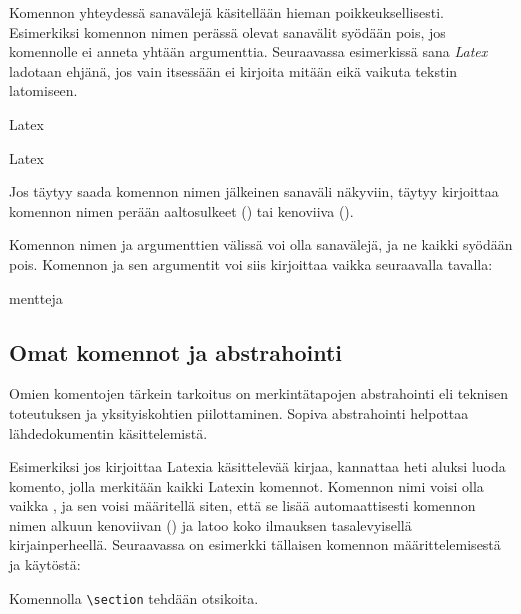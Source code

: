 Komennon yhteydessä sanavälejä käsitellään hieman poikkeuksellisesti.
Esimerkiksi komennon nimen perässä olevat sanavälit syödään pois, jos
komennolle ei anneta yhtään argumenttia. Seuraavassa esimerkissä sana
\emph{Latex} ladotaan ehjänä, jos vain  itsessään ei
kirjoita mitään eikä vaikuta tekstin latomiseen.

\begin{koodilohkosis}
La\komento   tex
\end{koodilohkosis}

\begin{tulossis}
  Latex
\end{tulossis}

\noindent
Jos täytyy saada komennon nimen jälkeinen sanaväli näkyviin, täytyy
kirjoittaa komennon nimen perään aaltosulkeet
(\komentoarg{}) tai kenoviiva
(\komentojatko{\keno}).

Komennon nimen ja argumenttien välissä voi olla sanavälejä, ja ne kaikki
syödään pois. Komennon ja sen argumentit voi siis kirjoittaa vaikka
seuraavalla tavalla:

\begin{koodilohkosis}
   {mentteja}
\end{koodilohkosis}

\subsection{Omat komennot ja abstrahointi}
\label{luku/komennot-abst}

Omien komentojen tärkein tarkoitus on merkintätapojen abstrahointi eli
teknisen toteutuksen ja yksityiskohtien piilottaminen. Sopiva
abstrahointi helpottaa lähdedokumentin käsittelemistä.

Esimerkiksi jos kirjoittaa Latexia käsittelevää kirjaa, kannattaa heti
aluksi luoda komento, jolla merkitään kaikki Latexin komennot. Komennon
nimi voisi olla vaikka , ja sen voisi määritellä
siten, että se lisää automaattisesti komennon nimen alkuun kenoviivan
(\keno) ja latoo koko ilmauksen tasalevyisellä kirjainperheellä.
Seuraavassa on esimerkki tällaisen komennon määrittelemisestä ja
käytöstä:

\begin{koodilohkosis}
\newcommand{\komento}[1]{\texttt{\textbackslash #1}}

Komennolla \komento{section} tehdään otsikoita.
\end{koodilohkosis}

